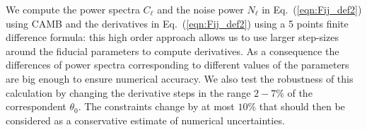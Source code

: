 \documentclass[aps,prd,reprint,superscriptaddress]{revtex4-1}
\newcommand\refeq[1]{Eq.~(\ref{eqn:#1})}
\begin{document}
We compute the power spectra $C_{\ell}$ and the noise power $N_{\ell}$ in \refeq{Fij_def2} using CAMB and
the derivatives in \refeq{Fij_def2} using a 5 points finite difference formula:
this high order approach allows us to use larger step-sizes around the fiducial parameters to compute derivatives. As a consequence the differences of power spectra corresponding to different values of the parameters are big enough to ensure numerical accuracy. %
We also test the robustness of this calculation by changing the derivative steps in the range $2-7\%$ of the correspondent $\theta_{0}$. The constraints change by at most $10\%$ that should then be considered as a conservative estimate of numerical uncertainties.
\end{document}
